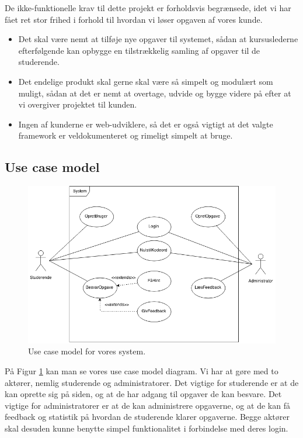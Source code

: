 \documentclass[12pt]{article}
\begin{document}
De ikke-funktionelle krav til dette projekt er forholdsvis begrænsede, idet vi har fået ret stor frihed i forhold til hvordan vi løser opgaven af vores kunde.

\begin{itemize}
\item Det skal være nemt at tilføje nye opgaver til systemet, sådan at kursuslederne efterfølgende kan opbygge en tilstrækkelig samling af opgaver til de studerende.
\item Det endelige produkt skal gerne skal være så simpelt og modulært som muligt, sådan at det er nemt at overtage, udvide og bygge videre på efter at vi overgiver projektet til kunden.
\item Ingen af kunderne er web-udviklere, så det er også vigtigt at det valgte framework er veldokumenteret og rimeligt simpelt at bruge.
\end{itemize}

\subsection{Use case model}
\label{sub:use_case_model}
\begin{figure}[htpb]
  \centering
  \includegraphics[width=0.8\linewidth]{figures/UseCaseModel.png}
  \caption{Use case model for vores system.}
  \label{fig:use_case_model}
\end{figure}
På Figur \ref{fig:use_case_model} kan man se vores use case model diagram. Vi har at gøre med to aktører, nemlig studerende og administratorer. Det vigtige for studerende er at de kan oprette sig på siden, og at de har adgang til opgaver de kan besvare. Det vigtige for administratorer er at de kan administrere opgaverne, og at de kan få feedback og statistik på hvordan de studerende klarer opgaverne. Begge aktører skal desuden kunne benytte simpel funktionalitet i forbindelse med deres login.
\end{document}
